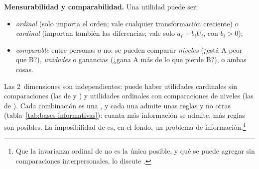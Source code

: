 \documentclass[11pt]{article}
\begin{document}
\begin{anotaciones}
\textbf{Mensurabilidad y comparabilidad.} Una utilidad puede ser:
\begin{itemize}
\item \emph{ordinal} (solo importa el orden; vale cualquier transformación creciente) o \emph{cardinal} (importan también las diferencias; vale solo $a_i+b_iU_i$, con $b_i>0$);
\item \emph{comparable} entre personas o no: se pueden comparar \emph{niveles} (¿está A peor que B?), \emph{unidades} o ganancias (¿gana A más de lo que pierde B?), o ambas cosas.
\end{itemize}
Las 2~dimensiones son independientes: puede haber utilidades cardinales sin comparaciones (las de  y  ) y utilidades ordinales con comparaciones de niveles (las de ). Cada combinación es una \nocite{Sen1970Collective}, y cada una admite unas reglas y no otras (tabla~\ref{tab:bases-informativas}): cuanta más información se admite, más reglas son posibles. La imposibilidad de  es, en el fondo, un problema de información.\footnote{Que la invarianza ordinal de  no es la única posible, y qué se puede agregar sin comparaciones interpersonales, lo discute \textcite{Nebel2022Aggregation}.}
\end{anotaciones}
\end{document}
